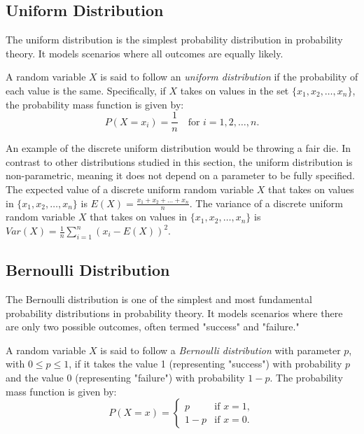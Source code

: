 %
%

\subsection{Uniform Distribution}

The uniform distribution is the simplest probability distribution in probability theory. It models scenarios where all outcomes are equally likely.

\begin{definition}
A random variable $X$ is said to follow an \emph{uniform distribution} if the probability of each value is the same. Specifically, if $X$ takes on values in the set $\{x_1, x_2, \ldots, x_n\}$, the probability mass function is given by:
\[
P(X = x_i) = \frac{1}{n} \quad \text{for } i = 1, 2, \ldots, n.
\]
\end{definition}

An example of the discrete uniform distribution would be throwing a fair die. In contrast to other distributions studied in this section, the uniform distribution is non-parametric, meaning it does not depend on a parameter to be fully specified. The expected value of a discrete uniform random variable $X$ that takes on values in $\{x_1, x_2, \ldots, x_n\}$ is $E(X) = \frac{x_1 + x_2 + \ldots + x_n}{n}$. The variance of a discrete uniform random variable $X$ that takes on values in $\{x_1, x_2, \ldots, x_n\}$ is $Var(X) = \frac{1}{n} \sum_{i=1}^n (x_i - E(X))^2$.

%
%

\subsection{Bernoulli Distribution}

The Bernoulli distribution is one of the simplest and most fundamental probability distributions in probability theory. It models scenarios where there are only two possible outcomes, often termed "success" and "failure."

\begin{definition}
A random variable $X$ is said to follow a \emph{Bernoulli distribution} with parameter $p$, with $0 \leq p \leq 1$, if it takes the value 1 (representing "success") with probability $p$ and the value 0 (representing "failure") with probability $1-p$. The probability mass function is given by:
\[
P(X = x) = 
\begin{cases} 
p & \text{if } x = 1, \\
1 - p & \text{if } x = 0.
\end{cases}
\]
\end{definition}


